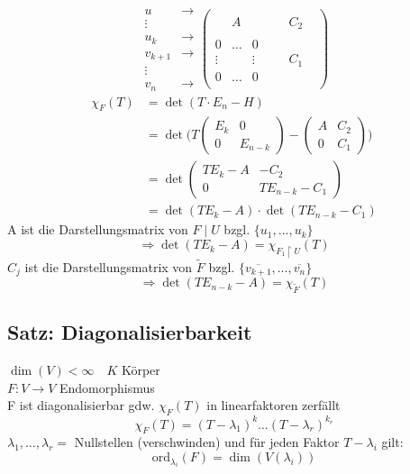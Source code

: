 \documentclass[titlepage,12pt,a4paper,ngerman]{report}
\begin{document}
$$\begin{matrix}
u & \rightarrow\\
\vdots \\
u_k & \rightarrow\\
v_{k+1} & \rightarrow\\
\vdots \\
v_n & \rightarrow
\end{matrix}
\begin{pmatrix}
& & & \\
& A & & & & C_2\\
& & & & \\
0 & \dots & 0 & &  \\
\vdots & & \vdots & & & C_1 & \\
0 & \dots & 0 & & & \\
\end{pmatrix} $$
\begin{align*}
\chi_F(T) &= \det(T\cdot E_n - H) \\
&= \det\bigg( T \begin{pmatrix}
E_k & 0 \\
0 & E_{n-k}
\end{pmatrix} - \begin{pmatrix}
A & C_2 \\
0 & C_1 
\end{pmatrix} \bigg)\\
&= \det\begin{pmatrix}
TE_k-A & -C_2 \\
0 & TE_{n-k} - C_1
\end{pmatrix} \\
&= \det(TE_k-A) \cdot \det(TE_{n-k} - C_1)
\end{align*}
A ist die Darstellungsmatrix von $ F \mid U $ bzgl. $\{u_1, \dots, u_k\}$ 
$$ \Rightarrow \det (TE_k -A) = \chi_{F_1 \upharpoonright U}(T)$$
$C_j$ ist die Darstellungsmatrix von $\tilde{F}$ bzgl. $\{\overline{v_{k+1}}, \dots, \overline{v_n}\}$\\
$$ \Rightarrow \det (TE_{n-k}-A) = \chi_{\tilde{F}}(T)$$
\subsection{Satz: Diagonalisierbarkeit}
$\dim(V) < \infty \quad K$ Körper \\
$ F: V\to V$ Endomorphismus\\
F ist diagonalisierbar gdw. $\chi_{F}(T)$ in linearfaktoren zerfällt
$$\chi_{F}(T) = (T-\lambda_1)^k \dots (T-\lambda_r)^{k_r}$$
$\lambda_1, \dots, \lambda_r = $ Nullstellen (verschwinden)
und für jeden Faktor $T-\lambda_i$ gilt:
$$\textrm{ord}_{\lambda_i}(F) = \dim(V(\lambda_i))$$
\end{document}
